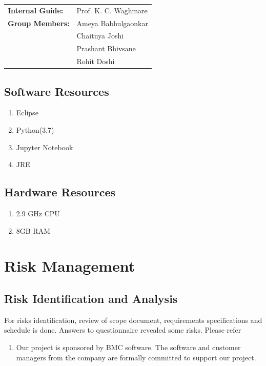 \documentclass[oneside,a4paper,12pt]{book}
\begin{document}
\begin {table*}[!htpb]
\renewcommand{\arraystretch}{1.3}
    \begin{tabular}{ l l }
        \textbf{Internal Guide:} & Prof. K. C. Waghmare \\
        \textbf{Group Members:} & Ameya Babhulgaonkar\\
        & Chaitnya Joshi\\
        & Prashant Bhivsane\\
        & Rohit Doshi\\
    \end{tabular}
\end {table*}
\newpage
\subsection{Software Resources}
\begin{enumerate}
    \item Eclipse\par
    \item Python(3.7)\par
    \item Jupyter Notebook\par
    \item JRE \par
\end{enumerate}
\subsection{Hardware Resources}
\begin{enumerate}
    \item 2.9 GHz CPU\par
    \item 8GB RAM\par
\end{enumerate}


\section{Risk Management}

\subsection{Risk Identification and Analysis}

\begin{justify}
For risks identification, review of scope document, requirements specifications and schedule is done. Answers to questionnaire revealed some risks. Please refer \setlength{\parskip}{0.0pt}
\begin{enumerate}
	\item Our project is sponsored by BMC software. The software and customer managers from the company are formally committed to support our project. 
\end{enumerate}
\end{justify}\par
\end{document}
